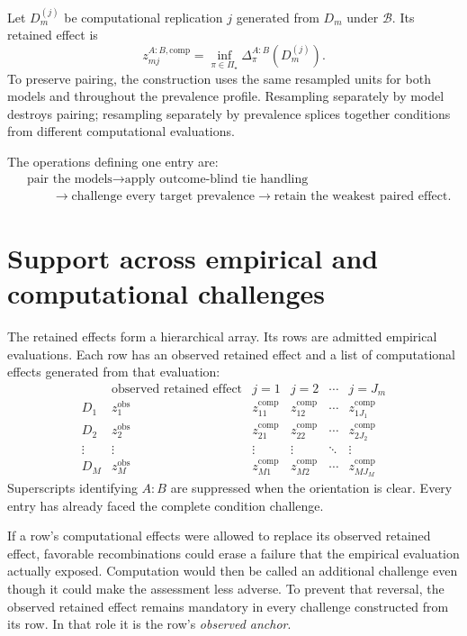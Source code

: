 \documentclass[11pt]{article}
\newcommand{\PSet}{\Pi_\star}
\newcommand{\Boot}{\mathcal{B}}
\theoremstyle{remark}
\begin{document}
Let $D_m^{(j)}$ be computational replication $j$ generated from $D_m$ under
$\Boot$. Its retained effect is
\begin{equation}
z_{mj}^{A:B,\mathrm{comp}}
=
\inf_{\pi\in\PSet}\Delta^{A:B}_\pi(D_m^{(j)}).
\label{eq:computational-retained}
\end{equation}
To preserve pairing, the construction uses the same resampled units for both
models and throughout the prevalence profile. Resampling separately by model
destroys pairing; resampling separately by prevalence splices together
conditions from different computational evaluations.

The operations defining one entry are:
\[
\begin{aligned}
&\text{pair the models}
\longrightarrow
\text{apply outcome-blind tie handling}\\
&\qquad\longrightarrow
\text{challenge every target prevalence}
\longrightarrow
\text{retain the weakest paired effect}.
\end{aligned}
\]

\section{Support across empirical and computational challenges}
\label{sec:hierarchy}

The retained effects form a hierarchical array. Its rows are admitted
empirical evaluations. Each row has an observed retained effect and a list of
computational effects generated from that evaluation:
\begin{equation}
\begin{array}{c|c|cccc}
&\text{observed retained effect}&j=1&j=2&\cdots&j=J_m\\
\hline
D_1&z_1^{\mathrm{obs}}&z_{11}^{\mathrm{comp}}&z_{12}^{\mathrm{comp}}&\cdots&z_{1J_1}^{\mathrm{comp}}\\
D_2&z_2^{\mathrm{obs}}&z_{21}^{\mathrm{comp}}&z_{22}^{\mathrm{comp}}&\cdots&z_{2J_2}^{\mathrm{comp}}\\
\vdots&\vdots&\vdots&\vdots&\ddots&\vdots\\
D_M&z_M^{\mathrm{obs}}&z_{M1}^{\mathrm{comp}}&z_{M2}^{\mathrm{comp}}&\cdots&z_{MJ_M}^{\mathrm{comp}}
\end{array}
\label{eq:effect-array}
\end{equation}
Superscripts identifying $A:B$ are suppressed when the orientation is clear.
Every entry has already faced the complete condition challenge.

If a row's computational effects were allowed to replace its observed retained
effect, favorable recombinations could erase a failure that the empirical
evaluation actually exposed. Computation would then be called an additional
challenge even though it could make the assessment less adverse. To prevent
that reversal, the observed retained effect remains mandatory in every
challenge constructed from its row. In that role it is the row's
\emph{observed anchor}.
\end{document}
